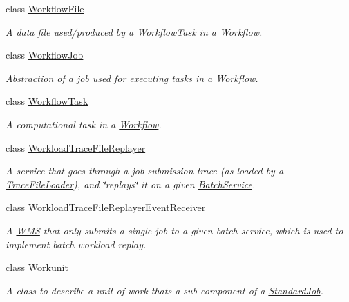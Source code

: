 \begin{DoxyCompactItemize}
class \hyperlink{classwrench_1_1_workflow_file}{Workflow\+File}
\begin{DoxyCompactList}\small\item\em A data file used/produced by a \hyperlink{classwrench_1_1_workflow_task}{Workflow\+Task} in a \hyperlink{classwrench_1_1_workflow}{Workflow}. \end{DoxyCompactList}\item 
class \hyperlink{classwrench_1_1_workflow_job}{Workflow\+Job}
\begin{DoxyCompactList}\small\item\em Abstraction of a job used for executing tasks in a \hyperlink{classwrench_1_1_workflow}{Workflow}. \end{DoxyCompactList}\item 
class \hyperlink{classwrench_1_1_workflow_task}{Workflow\+Task}
\begin{DoxyCompactList}\small\item\em A computational task in a \hyperlink{classwrench_1_1_workflow}{Workflow}. \end{DoxyCompactList}\item 
class \hyperlink{classwrench_1_1_workload_trace_file_replayer}{Workload\+Trace\+File\+Replayer}
\begin{DoxyCompactList}\small\item\em A service that goes through a job submission trace (as loaded by a \hyperlink{classwrench_1_1_trace_file_loader}{Trace\+File\+Loader}), and \char`\"{}replays\char`\"{} it on a given \hyperlink{classwrench_1_1_batch_service}{Batch\+Service}. \end{DoxyCompactList}\item 
class \hyperlink{classwrench_1_1_workload_trace_file_replayer_event_receiver}{Workload\+Trace\+File\+Replayer\+Event\+Receiver}
\begin{DoxyCompactList}\small\item\em A \hyperlink{classwrench_1_1_w_m_s}{W\+MS} that only submits a single job to a given batch service, which is used to implement batch workload replay. \end{DoxyCompactList}\item 
class \hyperlink{classwrench_1_1_workunit}{Workunit}
\begin{DoxyCompactList}\small\item\em A class to describe a unit of work that\textquotesingle{}s a sub-\/component of a \hyperlink{classwrench_1_1_standard_job}{Standard\+Job}. \end{DoxyCompactList}\item 

\end{DoxyCompactItemize}
